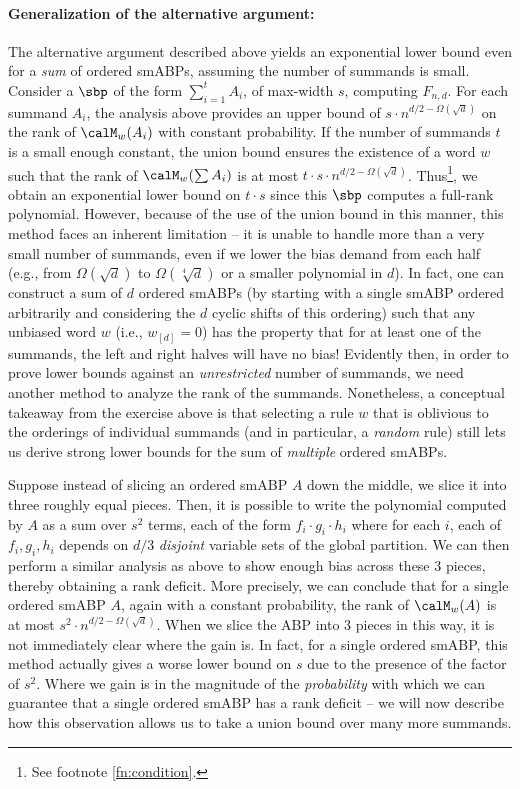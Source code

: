 \documentclass{article}
\begin{document}
\paragraph{Generalization of the alternative argument:} 
The alternative argument described above yields an exponential lower bound even for a \emph{sum} of ordered smABPs, assuming the number of summands is small. Consider a $\sbp$ of the form $\sum_{i=1}^t A_i$, of max-width $s$, computing $F_{n,d}$. For each summand $A_i$, the analysis above provides an upper bound of $s \cdot n^{d/2-\Omega(\sqrt{d})}$ on the rank of $\calM_w(A_i)$ with constant probability. If the number of summands $t$ is a small enough constant, the union bound ensures the existence of a word $w$ such that the rank of $\calM_w(\sum A_i)$ is at most $t\cdot s\cdot n^{d/2-\Omega(\sqrt{d})}$. Thus\footnote{See footnote \ref{fn:condition}.}, we obtain an exponential lower bound on $t\cdot s$ since this $\sbp$ computes a full-rank polynomial. However, because of the use of the union bound in this manner, this method faces an inherent limitation -- it is unable to handle more than a very small number of summands, even if we lower the bias demand from each half (e.g., from $\Omega(\sqrt{d})$ to $\Omega(\sqrt[4]{d})$ or a smaller polynomial in $d$). In fact, one can construct a sum of $d$ ordered smABPs (by starting with a single smABP ordered arbitrarily and considering the $d$ cyclic shifts of this ordering) such that any unbiased word $w$ (i.e., $w_{[d]} = 0$) has the property that for at least one of the summands, the left and right halves will have no bias! Evidently then, in order to prove lower bounds against an \emph{unrestricted} number of summands, we need another method to analyze the rank of the summands. Nonetheless, a conceptual takeaway from the exercise above is that selecting a rule $w$ that is oblivious to the orderings of individual summands (and in particular, a \emph{random} rule) still lets us derive strong lower bounds for the sum of \emph{multiple} ordered smABPs.

Suppose instead of slicing an ordered smABP $A$ down the middle, we slice it into three roughly equal pieces. Then, it is possible to write the polynomial computed by $A$ as a sum over $s^2$ terms, each of the form $f_i\cdot g_i\cdot h_i$ where for each $i$, each of $f_i, g_i, h_i$ depends on $d/3$ \emph{disjoint} variable sets of the global partition. We can then perform a similar analysis as above to show enough bias across these $3$ pieces, thereby obtaining a rank deficit. More precisely, we can conclude that for a single ordered smABP $A$, again with a constant probability, the rank of $\calM_w(A)$ is at most $s^2 \cdot n^{d/2-\Omega(\sqrt{d})}$. When we slice the ABP into $3$ pieces in this way, it is not immediately clear where the gain is. In fact, for a single ordered smABP, this method actually gives a worse lower bound on $s$ due to the presence of the factor of $s^2$. Where we gain is in the magnitude of the \emph{probability} with which we can guarantee that a single ordered smABP has a rank deficit -- we will now describe how this observation allows us to take a union bound over many more summands.
\end{document}
